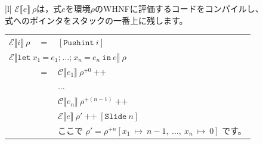 \documentclass{jbook}
\begin{document}
\begin{tabular} {|l|} \hline
	$\mathcal{E} \llbracket e \rrbracket ~ \rho$は，式$e$を環境$\rho$のWHNFに評価するコードをコンパイルし、       \\
	式へのポインタをスタックの一番上に残します。                                                                  \\
	\begin{tabular}{r c l}
		$\mathcal{E} \llbracket i \rrbracket ~ \rho$                                                               & $=$ & $\left[\texttt{Pushint} ~ i \right]$                                                                                                                                                         \\
		\multicolumn{3}{l}{$\mathcal{E} \llbracket \texttt{let} ~ x_1 ~ \texttt{=} ~ e_1\texttt{;} ~  \ldots \texttt{;} ~ x_n ~ \texttt{=} ~ e_n ~ \texttt{in} ~ e \rrbracket ~ \rho$}                                                                                                                                  \\
		                                                                                                           & $=$ & $\mathcal{C} \llbracket e_1 \rrbracket ~ \rho^{+0} ~ \texttt{++}$                                                                                                                            \\
		                                                                                                           &     & $\ldots$                                                                                                                                                                                     \\
		                                                                                                           &     & $\mathcal{C} \llbracket e_n \rrbracket ~ \rho^{+(n - 1)} ~ \texttt{++}$                                                                                                                      \\
		                                                                                                           &     & $\mathcal{E} \llbracket e \rrbracket ~ \rho' ~ \texttt{++} ~ \left[\texttt{Slide} ~ n\right]$                                                                                                \\
		                                                                                                           &     & ここで $\rho' = \rho^{+n} \left[x_1 ~ \mapsto ~ n - 1, ~ \ldots , ~ x_n ~ \mapsto ~ 0\right]$ です。                                                                                         \\

\end{tabular}
\end{tabular}
\end{document}
